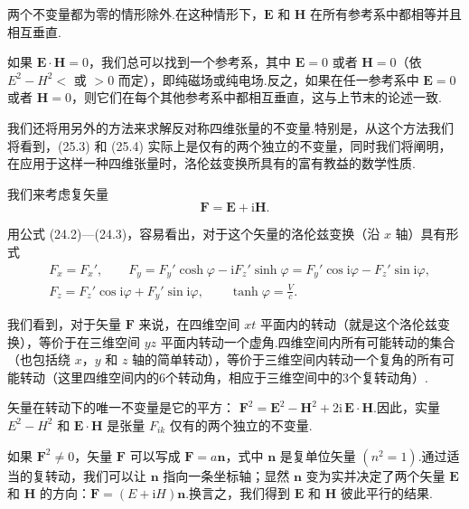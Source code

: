 两个不变量都为零的情形除外.在这种情形下，$\boldsymbol{E}$ 和 $\boldsymbol{H}$
在所有参考系中都相等并且相互垂直.

如果 $\boldsymbol{E}\cdot\boldsymbol{H}=0$，我们总可以找到一个参考系，其中 $\boldsymbol{E}=0$ 或者
$\boldsymbol{H}=0$（依 $E^2-H^2<$ 或 $>0$ 而定），即纯磁场或纯电场.反之，如果在任一参考系中
$\boldsymbol{E}=0$ 或者 $\boldsymbol{H}=0$，则它们在每个其他参考系中都相互垂直，这与上节末的论述一致.

我们还将用另外的方法来求解反对称四维张量的不变量.特别是，从这个方法我们将看到，(25.3) 和 (25.4)
实际上是仅有的两个独立的不变量，同时我们将阐明，在应用于这样一种四维张量时，洛伦兹变换所具有的富有教益的数学性质.

我们来考虑复矢量
\begin{equation}
  \boldsymbol{F}=\boldsymbol{E}+\mathrm{i}\boldsymbol{H}.
\end{equation}

用公式 (24.2)—(24.3)，容易看出，对于这个矢量的洛伦兹变换（沿 $x$ 轴）具有形式
\begin{equation}
\begin{aligned}
  &F_x=F_x',\qquad
  F_y=F_y'\cosh\varphi-\mathrm{i}F_z'\sinh\varphi
  =F_y'\cos\mathrm{i}\varphi-F_z'\sin\mathrm{i}\varphi,\\
  &F_z=F_z'\cos\mathrm{i}\varphi+F_y'\sin\mathrm{i}\varphi,\qquad
  \tanh\varphi=\frac{V}{c}.
\end{aligned}
\end{equation}

我们看到，对于矢量 $\boldsymbol{F}$ 来说，在四维空间 $xt$
平面内的转动（就是这个洛伦兹变换），等价于在三维空间 $yz$
平面内转动一个虚角.四维空间内所有可能转动的集合（也包括绕 $x$，$y$ 和 $z$
轴的简单转动），等价于三维空间内转动一个复角的所有可能转动（这里四维空间内的6个转动角，相应于三维空间中的3个复转动角）.

矢量在转动下的唯一不变量是它的平方：
$\boldsymbol{F}^2=\boldsymbol{E}^2-\boldsymbol{H}^2+2\mathrm{i}\,\boldsymbol{E}\cdot\boldsymbol{H}$.因此，实量
$E^2-H^2$ 和 $\boldsymbol{E}\cdot\boldsymbol{H}$ 是张量 $F_{ik}$ 仅有的两个独立的不变量.

如果 $\boldsymbol{F}^2\neq0$，矢量 $\boldsymbol{F}$ 可以写成
$\boldsymbol{F}=a\boldsymbol{n}$，式中 $\boldsymbol{n}$ 是复单位矢量 $(n^2=1)$.通过适当的复转动，我们可以让
$\boldsymbol{n}$ 指向一条坐标轴；显然 $\boldsymbol{n}$ 变为实并决定了两个矢量 $\boldsymbol{E}$ 和
$\boldsymbol{H}$ 的方向：$\boldsymbol{F}=(E+\mathrm{i}H)\boldsymbol{n}$.换言之，我们得到
$\boldsymbol{E}$ 和 $\boldsymbol{H}$ 彼此平行的结果.

